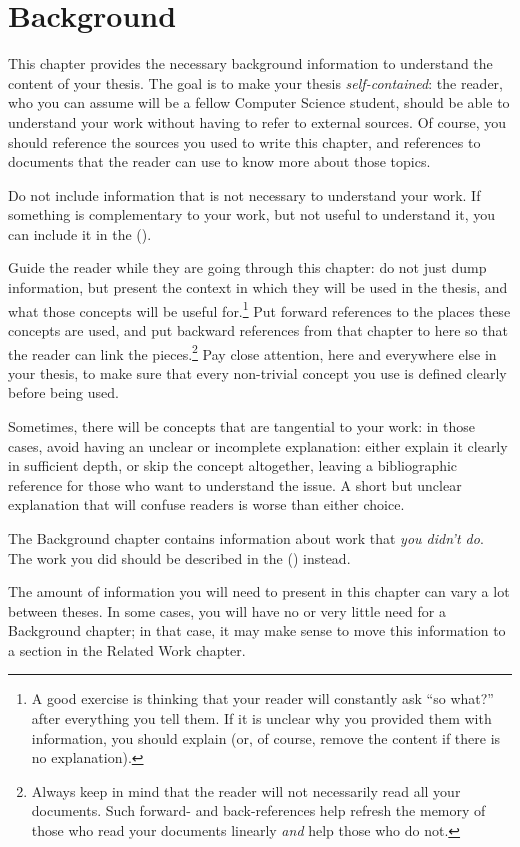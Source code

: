 \chapter{Background}
\label{ch:background}

This chapter provides the necessary background information to understand the content of your thesis.
The goal is to make your thesis \emph{self-contained}: the reader, who you can assume will be
a fellow Computer Science student, should be able to understand your work without having to refer
to external sources. Of course, you should reference the sources you used to write this chapter, and references to documents that the reader can use to know more about those topics.

Do not include information that is not necessary to understand your work. If something is complementary to your work, but not useful to understand it, you can include it in the  ().

Guide the reader while they are going through this chapter: do not just dump information, but present the context in which they will be used in the thesis, and what those concepts will be useful for.\footnote{A good exercise is thinking that your reader will constantly ask ``so what?'' after everything you tell them. If it is unclear why you provided them with information, you should explain (or, of course, remove the content if there is no explanation).}
Put forward references to the places these concepts are used, and put backward references from that chapter to here so that the reader can link the pieces.\footnote{Always keep in mind that the reader will not necessarily read all your documents. Such forward- and back-references help refresh the memory of those who read your documents linearly \emph{and} help those who do not.}
Pay close attention, here and everywhere else in your thesis, to make sure that every non-trivial concept you use is defined clearly before being used.

Sometimes, there will be concepts that are tangential to your work: in those cases, avoid having an unclear or incomplete explanation: either explain it clearly in sufficient depth, or skip the concept altogether, leaving a bibliographic reference for those who want to understand the issue. A short but unclear explanation that will confuse readers is worse than either choice.

The Background chapter contains information about work that \emph{you didn't do}. The work you
did should be described in the  () instead.

The amount of information you will need to present in this chapter can vary a lot between theses.
In some cases, you will have no or very little need for a Background chapter; in that case, it
may make sense to move this information to a section in the Related Work chapter.
